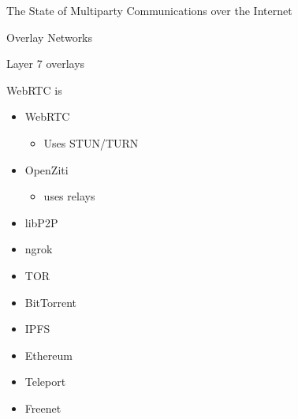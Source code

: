 \begin{frame}[fragile]{The State of Multiparty Communications over the
Internet}
\begin{block}{Overlay Networks}
\begin{block}{Layer 7 overlays}
\protect\hypertarget{layer-7-overlays}{}
\begin{block}{WebRTC is}
\protect\hypertarget{webrtc-is}{}
\begin{itemize}
\tightlist
\item
  WebRTC

  \begin{itemize}
  \tightlist
  \item
    Uses STUN/TURN
  \end{itemize}
\item
  OpenZiti

  \begin{itemize}
  \tightlist
  \item
    uses relays
  \end{itemize}
\item
  libP2P
\item
  ngrok
\item
  TOR
\item
  BitTorrent
\item
  IPFS
\item
  Ethereum
\item
  Teleport
\item
  Freenet
\end{itemize}
\end{block}
\end{block}
\end{block}
\end{frame}

